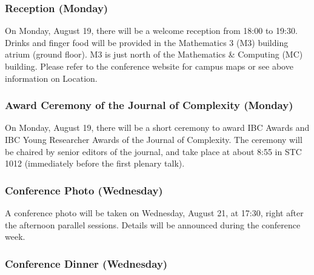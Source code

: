 \subsubsection{Reception (Monday)}

On Monday, August 19, there will be a welcome reception from 18:00 to 19:30.
Drinks and finger food will be provided in the Mathematics 3 (M3) building atrium (ground floor). 
M3 is just north of the Mathematics \& Computing (MC) building. 
Please refer to the conference website for campus maps or see above information on Location.


\subsubsection{Award Ceremony of the Journal of Complexity (Monday)}

On Monday, August 19, there will be a short ceremony to award IBC Awards and IBC Young Researcher Awards of the Journal of Complexity. 
The ceremony will be chaired by senior editors of the journal, and take place at about 8:55 in STC 1012
(immediately before the first plenary talk).




\subsubsection{Conference Photo (Wednesday)}

A conference photo will be taken on Wednesday, August 21, at 17:30, right after the afternoon parallel sessions. Details will be announced 
during the conference week.



\subsubsection{Conference Dinner (Wednesday)}

